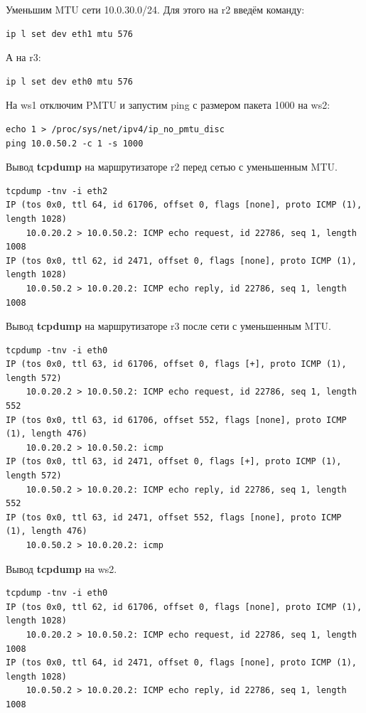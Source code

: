 \documentclass[a4paper,12pt]{article}
\begin{document}
Уменьшим MTU сети 10.0.30.0/24. Для этого на r2 введём команду:
\begin{Verbatim}
ip l set dev eth1 mtu 576
\end{Verbatim}

А на r3:
\begin{Verbatim}
ip l set dev eth0 mtu 576
\end{Verbatim}

На ws1 отключим PMTU и запустим ping с размером пакета 1000 на ws2:
\begin{Verbatim}
echo 1 > /proc/sys/net/ipv4/ip_no_pmtu_disc
ping 10.0.50.2 -c 1 -s 1000
\end{Verbatim}

Вывод \textbf{tcpdump} на маршрутизаторе r2 перед сетью с уменьшенным MTU.

\begin{Verbatim}
tcpdump -tnv -i eth2
IP (tos 0x0, ttl 64, id 61706, offset 0, flags [none], proto ICMP (1), length 1028)
    10.0.20.2 > 10.0.50.2: ICMP echo request, id 22786, seq 1, length 1008
IP (tos 0x0, ttl 62, id 2471, offset 0, flags [none], proto ICMP (1), length 1028)
    10.0.50.2 > 10.0.20.2: ICMP echo reply, id 22786, seq 1, length 1008
\end{Verbatim}

Вывод \textbf{tcpdump} на маршрутизаторе r3 после сети с уменьшенным MTU.

\begin{Verbatim}
tcpdump -tnv -i eth0
IP (tos 0x0, ttl 63, id 61706, offset 0, flags [+], proto ICMP (1), length 572) 
    10.0.20.2 > 10.0.50.2: ICMP echo request, id 22786, seq 1, length 552
IP (tos 0x0, ttl 63, id 61706, offset 552, flags [none], proto ICMP (1), length 476) 
    10.0.20.2 > 10.0.50.2: icmp
IP (tos 0x0, ttl 63, id 2471, offset 0, flags [+], proto ICMP (1), length 572)
    10.0.50.2 > 10.0.20.2: ICMP echo reply, id 22786, seq 1, length 552
IP (tos 0x0, ttl 63, id 2471, offset 552, flags [none], proto ICMP (1), length 476)
    10.0.50.2 > 10.0.20.2: icmp
\end{Verbatim}


Вывод \textbf{tcpdump} на ws2.

\begin{Verbatim}
tcpdump -tnv -i eth0
IP (tos 0x0, ttl 62, id 61706, offset 0, flags [none], proto ICMP (1), length 1028) 
    10.0.20.2 > 10.0.50.2: ICMP echo request, id 22786, seq 1, length 1008
IP (tos 0x0, ttl 64, id 2471, offset 0, flags [none], proto ICMP (1), length 1028)
    10.0.50.2 > 10.0.20.2: ICMP echo reply, id 22786, seq 1, length 1008
\end{Verbatim}
\end{document}
